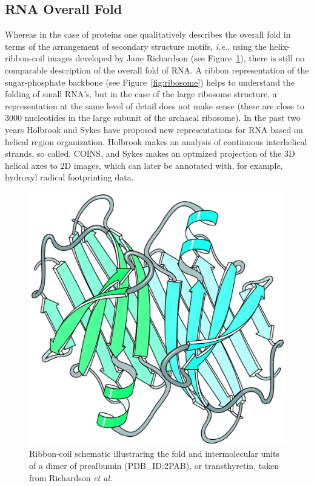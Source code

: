 \subsection{RNA  Overall Fold}
Whereas  in  the case  of  proteins  one qualitatively  describes  the
overall  fold  in terms  of  the  arrangement of  secondary  structure
motifs, \textit{i.e.}, using the helix-ribbon-coil images developed by
Jane          Richardson           \cite{richardson2000}          (see
Figure~\ref{fig:ribboncoil}), there is still no comparable description
of  the  overall   fold  of  RNA.  A  ribbon   representation  of  the
sugar-phosphate  backbone  (see  Figure~\ref{fig:ribosome})  helps  to
understand the  folding of small RNA's,  but in the case  of the large
ribosome structure, a representation at  the same level of detail does
not  make sense  (these are  close to  3000 nucleotides  in the  large
subunit of  the archaeal  ribosome).  In the  past two  years Holbrook
\cite{holbrook2008}  and  Sykes  \cite{sykes2009}  have  proposed  new
representations  for   RNA  based  on  helical   region  organization.
Holbrook  makes an  analysis  of continuous  interhelical strands,  so
called,  COINS, and  Sykes  makes  an optmized  projection  of the  3D
helical axes  to 2D  images, which  can later  be annotated  with, for
example, hydroxyl radical footprinting data.

\begin{figure}[ht]
\centering
\includegraphics[scale=0.4]{Chapter1/overallfold.png}
\caption{Ribbon-coil    schematic    illustraring    the   fold    and
  intermolecular  units of  a dimer  of prealbumin  (PDB\_ID:2PAB), or
  transthyretin,    taken     from    Richardson    \textit{et    al.}
  \cite{richardson2002}}
\label{fig:ribboncoil}
\end{figure}

